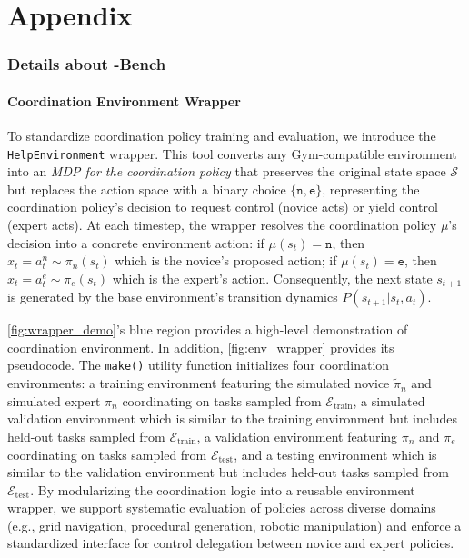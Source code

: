 \onecolumn
\doparttoc %
\faketableofcontents %

\part{Appendix}\label{appendix} %
\parttoc %


\clearpage

\section{Details about \ourMethod-Bench}\label{app:imp_details}

\subsection{Coordination Environment Wrapper}







To standardize coordination policy training and evaluation, we introduce the \texttt{HelpEnvironment} wrapper. This tool converts any Gym-compatible environment \citep{1606.01540, towers2024gymnasium} into an \textit{MDP for the coordination policy} that preserves the original state space $\mathcal{S}$ but replaces the action space with a binary choice $\{\texttt{n}, \texttt{e}\}$, representing the coordination policy's decision to request control (novice acts) or yield control (expert acts). At each timestep, the wrapper resolves the coordination policy $\mu$'s decision into a concrete environment action: if $\mu(s_t) = \texttt{n}$, then $x_t = a^n_t \sim \pi_n(s_t)$ which is the novice's proposed action; if $\mu(s_t) = \texttt{e}$, then $x_t = a^e_t \sim \pi_e(s_t)$ which is the expert's action. Consequently, the next state $s_{t+1}$ is generated by the base environment's transition dynamics $P(s_{t+1} | s_t, a_t)$.

\autoref{fig:wrapper_demo}'s \colorbox{sbBlue025}{blue region} provides a high-level demonstration of coordination environment. In addition, \autoref{fig:env_wrapper} provides its pseudocode. The \texttt{make()} utility function initializes four coordination environments: a training environment featuring the simulated novice $\tilde{\pi}_n$ and simulated expert $\pi_n$ coordinating on tasks sampled from $\mathcal{E}_{\text{train}}$, a simulated validation environment which is similar to the training environment but includes held-out tasks sampled from $\mathcal{E}_{\text{train}}$, 
a validation environment featuring $\pi_n$ and $\pi_e$ coordinating on tasks sampled from $\mathcal{E}_{\text{test}}$, 
and a testing environment which is similar to the validation environment but includes held-out tasks sampled from $\mathcal{E}_{\text{test}}$. 
By modularizing the coordination logic into a reusable environment wrapper, we support systematic evaluation of policies across diverse domains (e.g., grid navigation, procedural generation, robotic manipulation) and enforce a standardized interface for control delegation between novice and expert policies.

